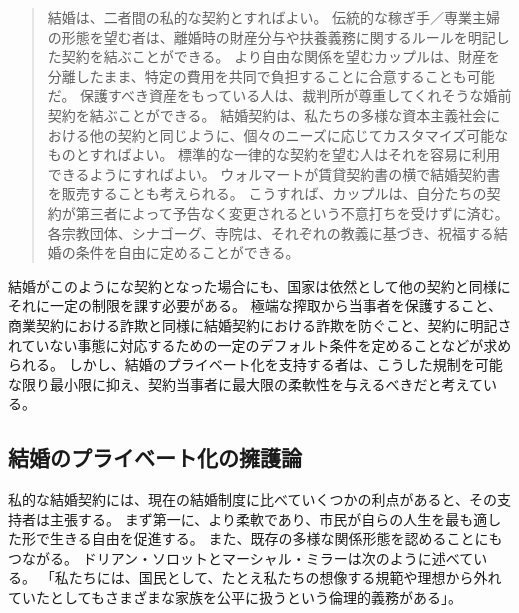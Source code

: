 \documentclass[paper=a4,book,openany]{jlreq}
\newcommand{\ig}[1]{}           %
\begin{document}
\begin{quote}
結婚は、二者間の私的な契約とすればよい。
伝統的な稼ぎ手／専業主婦の形態を望む者は、離婚時の財産分与や扶養義務に関するルールを明記した契約を結ぶことができる。
より自由な関係を望むカップルは、財産を分離したまま、特定の費用を共同で負担することに合意することも可能だ。
保護すべき資産をもっている人は、裁判所が尊重してくれそうな婚前契約を結ぶことができる。
結婚契約は、私たちの多様な資本主義社会における他の契約と同じように、個々のニーズに応じてカスタマイズ可能なものとすればよい。
標準的な一律的な契約を望む人はそれを容易に利用できるようにすればよい。
ウォルマートが賃貸契約書の横で結婚契約書を販売することも考えられる。
こうすれば、カップルは、自分たちの契約が第三者によって予告なく変更されるという不意打ちを受けずに済む。
各宗教団体、シナゴーグ、寺院は、それぞれの教義に基づき、祝福する結婚の条件を自由に定めることができる。
\citep{boaz97:_privat_marriag}

\end{quote}

結婚がこのようにな契約となった場合にも、国家は依然として他の契約と同様にそれに一定の制限を課す必要がある。
極端な搾取から当事者を保護すること、商業契約における詐欺と同様に結婚契約における詐欺を防ぐこと、契約に明記されていない事態に対応するための一定のデフォルト条件を定めることなどが求められる。
しかし、結婚のプライベート化を支持する者は、こうした規制を可能な限り最小限に抑え、契約当事者に最大限の柔軟性を与えるべきだと考えている。

\subsection{結婚のプライベート化の擁護論}

私的な結婚契約には、現在の結婚制度に比べていくつかの利点があると、その支持者は主張する。
まず第一に、より柔軟であり、市民が自らの人生を最も適した形で生きる自由を促進する。
また、既存の多様な関係形態を認めることにもつながる。
ドリアン・ソロットとマーシャル・ミラー\ig{Marshall Miller}は次のように述べている。
「私たちには、国民として、たとえ私たちの想像する規範や理想から外れていたとしてもさまざまな家族を公平に扱うという倫理的義務がある」\citep[p.89]{solot06:_takin_gover_out_marriag_busin}。
\end{document}
